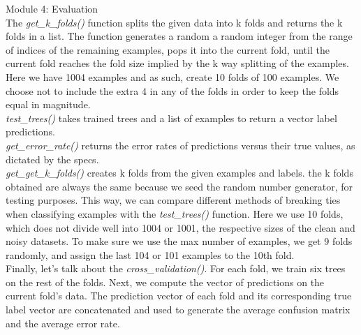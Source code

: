 Module 4: Evaluation \\
The \emph{get\_k\_folds()} function splits the given data into k folds and returns the k folds in a list.
The function generates a random a random integer from the range of indices
of the remaining examples, pops it into the current fold, until the current fold reaches the fold size implied
by the k way splitting of the examples. Here we have 1004 examples and as such, create 10 folds of 100 examples.
We choose not to include the extra 4 in any of the folds in order to keep the folds equal in magnitude.\\
\emph{test\_trees()} takes trained trees and a list of examples to return a vector label predictions.\\
\emph{get\_error\_rate()} returns the error rates of predictions versus their true values, as dictated by the specs.\\
\emph{get\_get\_k\_folds()} creates k folds from the given examples and labels. the k folds obtained are always the same
because we seed the random number generator, for testing purposes. This way, we can compare different methods of breaking ties
when classifying examples with the \emph{test\_trees()} function.
Here we use 10 folds, which does not divide well into 1004 or 1001, the respective sizes of the clean and noisy datasets.
To make sure we use the max number of examples, we get 9 folds randomly, and assign the last 104 or 101 examples to the
10th fold.\\
Finally, let's talk about the \emph{cross\_validation()}.
For each fold, we train six trees on the rest of the folds. Next, we compute the vector of predictions on the current fold's data.
The prediction vector of each fold and its corresponding true label vector are concatenated and used to generate the average confusion
matrix and the average error rate.
